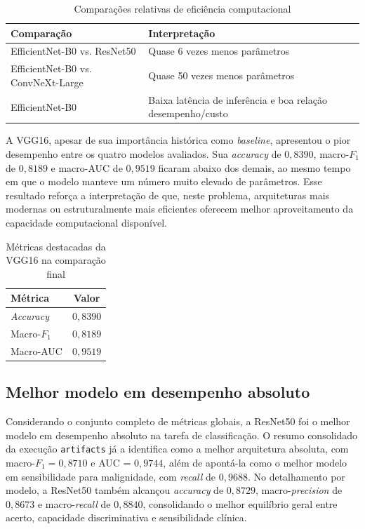 \documentclass[tcc,capa]{texufpel}
\begin{document}
\begin{table}[htbp]
	\centering
	\caption{Comparações relativas de eficiência computacional}
	\label{tab:comparacao_eficiencia_relativa}
	\begin{tabular}{|p{5.5cm}|p{8.5cm}|}
		\hline
		\textbf{Comparação} & \textbf{Interpretação} \\ \hline
		EfficientNet-B0 vs. ResNet50 & Quase 6 vezes menos parâmetros \\ \hline
		EfficientNet-B0 vs. ConvNeXt-Large & Quase 50 vezes menos parâmetros \\ \hline
		EfficientNet-B0 & Baixa latência de inferência e boa relação desempenho/custo \\ \hline
	\end{tabular}
\end{table}

A VGG16, apesar de sua importância histórica como \textit{baseline}, apresentou o pior desempenho entre os quatro modelos avaliados. Sua \textit{accuracy} de \(0{,}8390\), macro-\(F_1\) de \(0{,}8189\) e macro-AUC de \(0{,}9519\) ficaram abaixo dos demais, ao mesmo tempo em que o modelo manteve um número muito elevado de parâmetros. Esse resultado reforça a interpretação de que, neste problema, arquiteturas mais modernas ou estruturalmente mais eficientes oferecem melhor aproveitamento da capacidade computacional disponível.

\begin{table}[htbp]
	\centering
	\caption{Métricas destacadas da VGG16 na comparação final}
	\label{tab:vgg16_metricas_comparacao}
	\begin{tabular}{|l|c|}
		\hline
		\textbf{Métrica} & \textbf{Valor} \\ \hline
		\textit{Accuracy} & \(0{,}8390\) \\ \hline
		Macro-\(F_1\) & \(0{,}8189\) \\ \hline
		Macro-AUC & \(0{,}9519\) \\ \hline
	\end{tabular}
\end{table}

\subsection{Melhor modelo em desempenho absoluto}

Considerando o conjunto completo de métricas globais, a ResNet50 foi o melhor modelo em desempenho absoluto na tarefa de classificação. O resumo consolidado da execução \texttt{artifacts} já a identifica como a melhor arquitetura absoluta, com macro-\(F_1 = 0{,}8710\) e AUC = \(0{,}9744\), além de apontá-la como o melhor modelo em sensibilidade para malignidade, com \textit{recall} de \(0{,}9688\). No detalhamento por modelo, a ResNet50 também alcançou \textit{accuracy} de \(0{,}8729\), macro-\textit{precision} de \(0{,}8673\) e macro-\textit{recall} de \(0{,}8840\), consolidando o melhor equilíbrio geral entre acerto, capacidade discriminativa e sensibilidade clínica.
\end{document}
